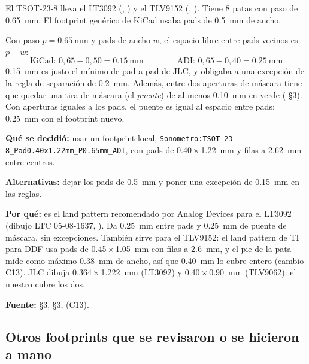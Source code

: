 El TSOT-23-8 lleva el LT3092 (, ) y el TLV9152 (, ). Tiene 8 patas con paso de \SI{0.65}{\milli\meter}. El footprint genérico de KiCad usaba pads de \SI{0.5}{\milli\meter} de ancho.

\begin{calculo}
Con paso $p=\SI{0.65}{\milli\meter}$ y pads de ancho $w$, el espacio libre entre pads vecinos es $p-w$:
\[
\text{KiCad: } 0{,}65-0{,}50=\SI{0.15}{\milli\meter}\qquad\qquad \text{ADI: } 0{,}65-0{,}40=\SI{0.25}{\milli\meter}
\]
\SI{0.15}{\milli\meter} es justo el mínimo de pad a pad de JLC, y obligaba a una excepción de la regla de separación de \SI{0.2}{\milli\meter}. Además, entre dos aperturas de máscara tiene que quedar una tira de máscara (el \emph{puente}) de al menos \SI{0.10}{\milli\meter} en verde ( §3). Con aperturas iguales a los pads, el puente es igual al espacio entre pads: \SI{0.25}{\milli\meter} con el footprint nuevo.
\end{calculo}

\begin{decision}
\textbf{Qué se decidió:} usar un footprint local, \nolinkurl{Sonometro:TSOT-23-8_Pad0.40x1.22mm_P0.65mm_ADI}, con pads de \num{0.40}\,$\times$\,\SI{1.22}{\milli\meter} y filas a \SI{2.62}{\milli\meter} entre centros.

\textbf{Alternativas:} dejar los pads de \SI{0.5}{\milli\meter} y poner una excepción de \SI{0.15}{\milli\meter} en las reglas.

\textbf{Por qué:} es el land pattern recomendado por Analog Devices para el LT3092 (dibujo LTC 05-08-1637, ). Da \SI{0.25}{\milli\meter} entre pads y \SI{0.25}{\milli\meter} de puente de máscara, sin excepciones. También sirve para el TLV9152: el land pattern de TI para DDF usa pads de \num{0.45}\,$\times$\,\SI{1.05}{\milli\meter} con filas a \SI{2.6}{\milli\meter}, y el pie de la pata mide como máximo \SI{0.38}{\milli\meter} de ancho, así que \SI{0.40}{\milli\meter} lo cubre entero (cambio C13). JLC dibuja \num{0.364}\,$\times$\,\SI{1.222}{\milli\meter} (LT3092) y \num{0.40}\,$\times$\,\SI{0.90}{\milli\meter} (TLV9062): el nuestro cubre los dos.

\textbf{Fuente:}  §3,  §3,  (C13).
\end{decision}

\subsection{Otros footprints que se revisaron o se hicieron a mano}


